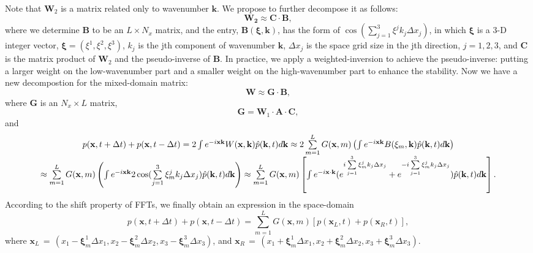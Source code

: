 Note that $\mathbf{W}_2$ is a matrix related only to wavenumber $\mathbf{k}$. 
We propose to further decompose it as follows:
\begin{equation}
  \label{eq:w2}
  \mathbf{W_2} \approx \mathbf{C} \cdot \mathbf{B}, 
\end{equation}
where we determine $\mathbf{B}$ to be an $L\times N_x$ matrix, and the entry, $\mathbf{B}(\mathbf{\xi},\mathbf{k})$, has the form of $\cos(\sum\limits_{j=1}^3{\xi^j k_j\Delta x_j})$,
in which $\mathbf{\xi}$ is a 3-D integer vector, $\mathbf{\xi}=(\xi^1,\xi^2,\xi^3)$, $k_j$ is the jth component of wavenumber $\mathbf{k}$, $\Delta x_j$ is the space grid size in the jth direction, $j=1,2,3$, 
and $\mathbf{C}$ is the matrix product of $\mathbf{W}_2$ and the pseudo-inverse of $\mathbf{B}$.
In practice, we apply a weighted-inversion to achieve the pseudo-inverse:
putting a larger weight on the low-wavenumber part and a smaller weight on the high-wavenumber part to enhance the stability.
Now we have a new decompostion for the mixed-domain matrix: 
\begin{equation}
  \label{eq:dematrix}
  \mathbf{W} \approx \mathbf{G} \cdot \mathbf{B},
\end{equation} 
where $\mathbf{G}$ is an $N_x\times L$ matrix, 
\begin{equation}
  \label{eq:Gmatrix}
  \mathbf{G} = \mathbf{W}_1 \cdot \mathbf{A} \cdot \mathbf{C},
\end{equation} 
and
\begin{equation}
\label{eq:la}
\begin{array}{*{20}c}
  p(\mathbf{x},t+\Delta t) + p(\mathbf{x},t-\Delta t) = 2 \int e^{-i \mathbf{x} \mathbf{k}} W(\mathbf{x},\mathbf{k}) \hat{p}(\mathbf{k},t) d \mathbf{k} \approx 2 \sum\limits_{m=1}^L G(\mathbf{x},m)  \left(\int e^{-i \mathbf{x}\mathbf{k}} B(\mathbf{\xi}_m,\mathbf{k}) \hat{p}(\mathbf{k},t) d\mathbf{k} \right)\\
 \approx  \sum\limits_{m=1}^L G(\mathbf{x},m)  \left(\int e^{-i \mathbf{x}\mathbf{k}} 2\cos(\sum\limits_{j=1}^3{\xi_m^j k_j\Delta x_j}) \hat{p}(\mathbf{k},t) d\mathbf{k} \right) \approx  \sum\limits_{m=1}^L G(\mathbf{x},m)  \left[\int e^{-i \mathbf{x} \cdot \mathbf{k}} (e^{i \sum\limits_{j=1}^3{\xi_m^j k_j\Delta x_j}} + e^{-i \sum\limits_{j=1}^3{\xi_m^j k_j\Delta x_j}})\hat{p}(\mathbf{k},t) d\mathbf{k} \right].\\
\end{array}
\end{equation}
According to the shift property of FFTs, we finally obtain an expression in the space-domain 
\begin{equation}
  \label{eq:stencil}
  p(\mathbf{x},t+\Delta t) + p(\mathbf{x},t-\Delta t) = \sum\limits_{m=1}^L G(\mathbf{x},m) [p(\mathbf{x}_L,t)+p(\mathbf{x}_R,t)], 
\end{equation}
where $\mathbf{x}_L\,=\,(x_1-\mathbf{\xi}_m^1\Delta x_1,x_2-\mathbf{\xi}_m^2\Delta x_2,x_3-\mathbf{\xi}_m^3\Delta x_3)$, and 
 $\mathbf{x}_R\,=\,(x_1+\mathbf{\xi}_m^1\Delta x_1,x_2+\mathbf{\xi}_m^2\Delta x_2,x_3+\mathbf{\xi}_m^3\Delta x_3)$.\\

